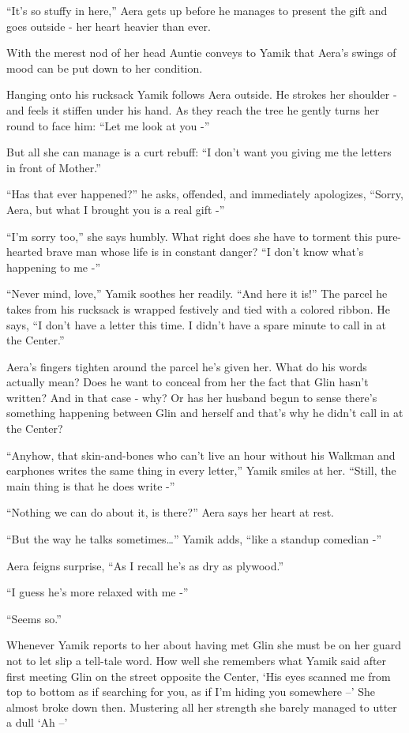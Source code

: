 \documentclass[twoside,11pt]{book}
\begin{document}
``It's so stuffy in here,'' Aera gets up before he manages to present the gift and goes
outside - her heart heavier than ever.

With the merest nod of her head Auntie conveys to Yamik that Aera's swings of mood can be put down to her condition.

Hanging onto his rucksack Yamik follows Aera outside. He strokes her shoulder - and feels it stiffen under his hand. As
they reach the tree he gently turns her round to face him: ``Let me look at you -''

But all she can manage is a curt rebuff: ``I don't want you giving me the letters in front of
Mother.''

``Has that ever happened?'' he asks, offended, and immediately apologizes,
``Sorry, Aera, but what I brought you is a real gift -''

``I'm sorry too,'' she says humbly. What right does she have to torment this pure-hearted
brave man whose life is in constant danger? ``I don't know what's happening to me -''

``Never mind, love,'' Yamik soothes her readily. ``And here it is!''
The parcel he takes from his rucksack is wrapped festively and tied with a colored ribbon. He says, ``I
don't have a letter this time. I didn't have a spare minute to call in at the Center.''

Aera's fingers tighten around the parcel he's given her. What do his words actually mean? Does he want to conceal from
her the fact that Glin hasn't written? And in that case - why? Or has her husband begun to sense there's something
happening between Glin and herself and that's why he didn't call in at the Center?

``Anyhow, that skin-and-bones who can't live an hour without his Walkman and earphones writes the same
thing in every letter,'' Yamik smiles at her. ``Still, the main thing is that he does write
-''

``Nothing we can do about it, is there?'' Aera says her heart at rest.

``But the way he talks sometimes{\dots}'' Yamik adds, ``like a standup comedian
-''

Aera feigns surprise, ``As I recall he's as dry as plywood.''

``I guess he's more relaxed with me -''

``Seems so.''

Whenever Yamik reports to her about having met Glin she must be on her guard not to let slip a tell-tale word. How
well she remembers what Yamik said after first meeting Glin on the street opposite the Center, `His eyes scanned me
from top to bottom as if searching for you, as if I'm hiding you somewhere --' She almost broke down then. Mustering
all her strength she barely managed to utter a dull  `Ah --'
\end{document}
